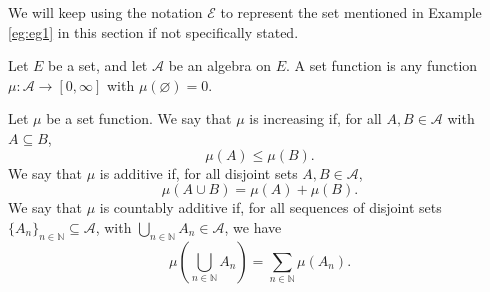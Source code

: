 \documentclass[11pt,singlecolumn, openany, citestyle=authoryear]{elegantbook}
\begin{document}
\begin{CJK}{UTF8}{gbsn}
We will keep using the notation $\mathcal{E}$ to represent the set mentioned in 
Example \ref{eg:eg1} in this section if not specifically stated.

\begin{definition}
    Let $E$ be a set, and let $\mathcal{A}$ be an algebra on $E$.
A set function is any function $\mu : \mathcal{A} \to [0, \infty]$ with $\mu (\varnothing ) = 0$.
\end{definition}

Let $\mu$ be a set function.
We say that $\mu$ is increasing if, for all $A, B \in \mathcal{A}$ with $A \subseteq B$,
$$
\mu(A) \leq \mu(B).
$$
We say that $\mu$ is additive if, for all disjoint sets $A, B \in \mathcal{A}$,
$$
\mu(A \cup B) = \mu(A) + \mu(B).
$$
We say that $\mu$ is countably additive if, for all sequences of disjoint sets 
$\{A_n\}_{n\in \mathbb{N}} \subseteq \mathcal{A}$, with
$\displaystyle \bigcup_{n \in \mathbb{N}} A_n \in \mathcal{A}$, we have
$$
\mu(\bigcup_{n \in \mathbb{N}} A_n) = \sum_{n \in \mathbb{N}} \mu(A_n).
$$


\end{CJK}
\end{document}
